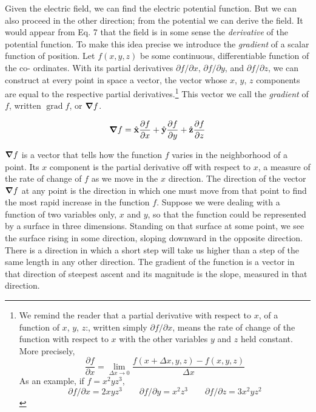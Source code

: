 Given the electric field, we can find the electric potential function.
But we can also proceed in the other direction; from the potential we
can derive the field. It would appear from Eq. 7 that the field is in
some sense the \emph{derivative} of the potential function. To make this idea
precise we introduce the \emph{gradient} of a scalar function of position.
Let $f(x,y,z)$ be some continuous, differentiable function of the co-
ordinates. With its partial derivatives $\partial f/\partial x$, 
$\partial f/\partial y$, and $\partial f/\partial z$,  we
can construct at every point in space a vector, the vector whose $x$, $y$, $z$
components are equal to the respective partial derivatives.\footnote{We
remind the reader that a partial derivative with respect to $x$, of a function of
$x$, $y$, $z$:, written simply $\partial f/\partial x$,
means the rate of change of the function with respect to $x$
with the other variables $y$ and $z$ held constant. More precisely,
\begin{equation*}
  \frac{\partial f}{\partial x} = \lim_{\Delta x\rightarrow0} \frac{f(x+\Delta x,y,z)-f(x,y,z)}{\Delta x}
\end{equation*}
As an example, if $f = x^2yz^3$,
\begin{equation*}
  \partial f/\partial x=2xyz^3 \qquad \partial f/\partial y=x^2z^3 \qquad \partial f/\partial z = 3x^2yz^2
\end{equation*}
} This
vector we call the \emph{gradient} of $f$, written $\operatorname{grad} f$, or $\boldsymbol{\nabla} f$.
\begin{framed}
\begin{equation}
  \boldsymbol{\nabla} f = \hat{\mathbf{x}} \frac{\partial f}{\partial x} + \hat{\mathbf{y}} \frac{\partial f}{\partial y}
          + \hat{\mathbf{z}} \frac{\partial f}{\partial z}
\end{equation}
\end{framed}
\noindent $\boldsymbol{\nabla} f$ is a vector that tells how the function $f$ varies in the neighborhood
of a point. Its $x$ component is the partial derivative off with respect
to $x$, a measure of the rate of change of $f$ as we move in the $x$ direction.
The direction of the vector $\boldsymbol{\nabla} f$ at any point is the direction in which
one must move from that point to find the most rapid increase in the
function $f$. Suppose we were dealing with a function of two variables
only, $x$ and $y$, so that the function could be represented by a surface
in three dimensions. Standing on that surface at some point, we see
the surface rising in some direction, sloping downward in the opposite
direction. There is a direction in which a short step will take us
higher than a step of the same length in any other direction. The
gradient of the function is a vector in that direction of steepest ascent
and its magnitude is the slope, measured in that direction.

